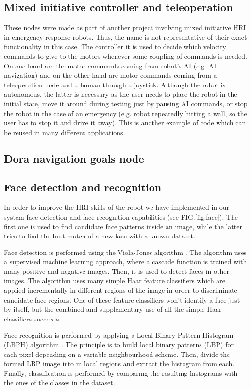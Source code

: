 \documentclass[conference]{IEEEtran}
\begin{document}
\subsection{Mixed initiative controller and teleoperation}
These nodes were made as part of another project involving mixed initiative HRI in emergency response robots. Thus, the name is not representative of their exact functionality in this case. The controller it is used to decide which velocity commands to give to the motors whenever some coupling of commands is needed. On one hand are the motor commands coming from robot's AI (e.g. AI navigation) and on the other hand are motor commands coming from a teleoperation node and a human through a joystick. Although the robot is autonomous, the latter is necessary as the user needs to place the robot in the initial state, move it around during testing just by pausing AI commands, or stop the robot in the case of an emergency (e.g. robot repeatedly hitting a wall, so the user has to stop it and drive it away).  This is another example of code which can be reused in many different applications.

\subsection{Dora navigation goals node}

\subsection{Face detection and recognition}
In order to improve the HRI skills of the robot we have implemented in our system face detection and face recognition capabilities (see FIG.\ref{fig:face}). The first one is used to find candidate face patterns inside an image, while the latter tries to find the best match of a new face with a known dataset.

Face detection is performed using the Viola-Jones algorithm \cite{Viola01_RapidObjDet}. The algorithm uses a supervised machine learning approach, where a cascade function is trained with many positive and negative images. Then, it is used to detect faces in other images. The algorithm uses many simple Haar feature classifiers which are applied incrementally in different regions of the image in order to discriminate candidate face regions. One of these feature classifiers won't identify a face just by itself, but the combined and supplementary use of all the simple Haar classifiers succeeds.

Face recognition is performed by applying a Local Binary Pattern Histogram (LBPH) algorithm \cite{Ahonen04_FaceRecLBP}.  The principle is to build local binary patterns (LBP) for each pixel depending on a variable neighbourhood scheme. Then, divide the formed LBP image into m local regions and extract the histogram from each. Finally, classification is performed by comparing the resulting histograms with the ones of the classes in the dataset.
\end{document}
